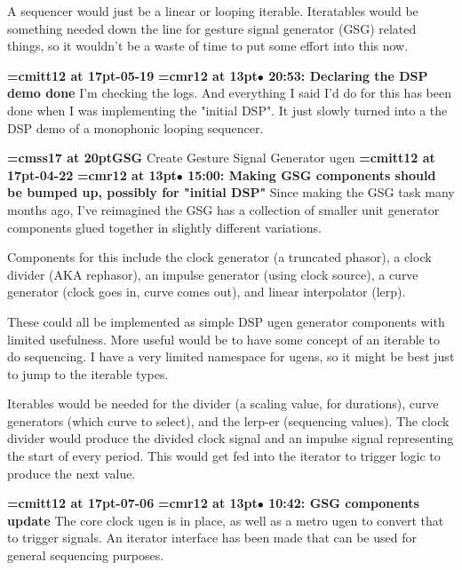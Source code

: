 A sequencer would just be a linear or looping iterable. Iteratables would be something needed down the line for gesture signal generator (GSG) related things, so it wouldn't be a waste of time to put some effort into this now.
\par

{\medskip\noindent\bf\font\titlefont=cmitt12 at 17pt-05-19}\medskip
{\smallskip\noindent\bf\font\titlefont=cmr12 at 13pt\titlefont $\bullet$ 20:53: Declaring the DSP demo done}\smallskip
I'm checking the logs. And everything I said I'd do for this has been done when I was implementing the "initial DSP". It just slowly turned into a the DSP demo of a monophonic looping sequencer.
\par

{\medskip\noindent\bf\font\titlefont=cmss17 at 20pt\titlefont GSG}\medskip
Create Gesture Signal Generator ugen
{\medskip\noindent\bf\font\titlefont=cmitt12 at 17pt-04-22}\medskip
{\smallskip\noindent\bf\font\titlefont=cmr12 at 13pt\titlefont $\bullet$ 15:00: Making GSG components should be bumped up, possibly for "initial DSP"}\smallskip
Since making the GSG task many months ago, I've reimagined the GSG has a collection of smaller unit generator components glued together in slightly different variations.
\par

Components for this include the clock generator (a truncated phasor), a clock divider (AKA rephasor), an impulse generator (using clock source), a curve generator (clock goes in, curve comes out), and linear interpolator (lerp).
\par

These could all be implemented as simple DSP ugen generator components with limited usefulness. More useful would be to have some concept of an iterable to do sequencing. I have a very limited namespace for ugens, so it might be best just to jump to the iterable types.
\par

Iterables would be needed for the divider (a scaling value, for durations), curve generators (which curve to select), and the lerp-er (sequencing values). The clock divider would produce the divided clock signal and an impulse signal representing the start of every period. This would get fed into the iterator to trigger logic to produce the next value.
\par

{\medskip\noindent\bf\font\titlefont=cmitt12 at 17pt-07-06}\medskip
{\smallskip\noindent\bf\font\titlefont=cmr12 at 13pt\titlefont $\bullet$ 10:42: GSG components update}\smallskip
The core clock ugen is in place, as well as a metro ugen to convert that to trigger signals. An iterator interface has been made that can be used for general sequencing purposes.
\par

